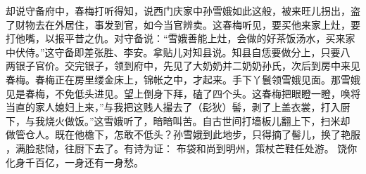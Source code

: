 却说守备府中，春梅打听得知，说西门庆家中孙雪娥如此这般，被来旺儿拐出，盗
了财物去在外居住，事发到官，如今当官辨卖。这春梅听见，要买他来家上灶，要
打他嘴，以报平昔之仇。对守备说：“雪娥善能上灶，会做的好茶饭汤水，买来家
中伏侍。”这守备即差张胜、李安。拿贴儿对知县说。知县自恁要做分上，只要八
两银子官价。交完银子，领到府中，先见了大奶奶并二奶奶孙氏，次后到房中来见
春梅。春梅正在房里缕金床上，锦帐之中，才起来。手下丫鬟领雪娥见面。那雪娥
见是春梅，不免低头进见。望上倒身下拜，磕了四个头。这春梅把眼瞪一瞪，唤将
当直的家人媳妇上来，”与我把这贱人撮去了（髟狄）髻，剥了上盖衣裳，打入厨
下，与我烧火做饭。”这雪娥听了，暗暗叫苦。自古世间打墙板儿翻上下，扫米却
做管仓人。既在他檐下，怎敢不低头？孙雪娥到此地步，只得摘了髻儿，换了艳服
，满脸悲恸，往厨下去了。有诗为证：
布袋和尚到明州，策杖芒鞋任处游。
饶你化身千百亿，一身还有一身愁。